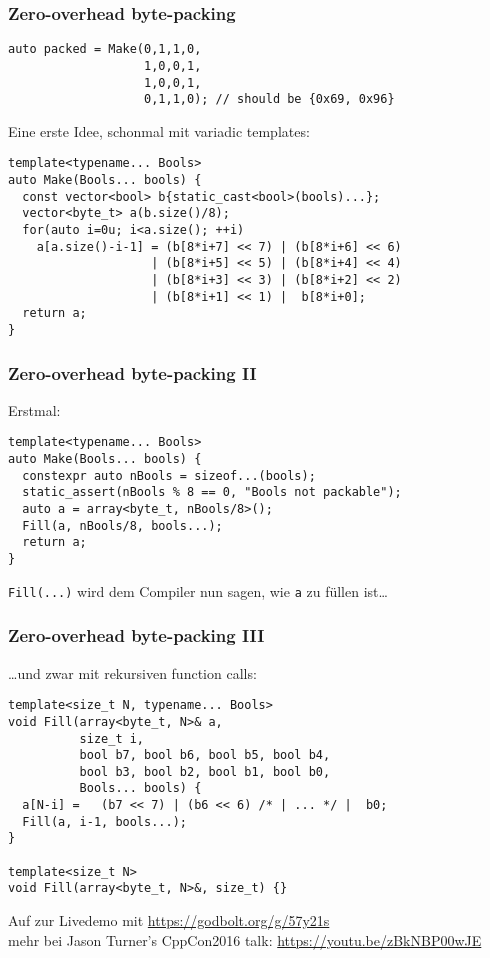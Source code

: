 \documentclass[t,ngerman,usepdftitle=false]{beamer}
\begin{document}
\begin{frame}[fragile]
  \frametitle{Zero-overhead byte-packing}
  \begin{lstlisting}
auto packed = Make(0,1,1,0,
                   1,0,0,1,	
                   1,0,0,1,
                   0,1,1,0); // should be {0x69, 0x96}
  \end{lstlisting}

\pause
Eine erste Idee, schonmal mit variadic templates:
\begin{lstlisting}
template<typename... Bools>
auto Make(Bools... bools) {
  const vector<bool> b{static_cast<bool>(bools)...};
  vector<byte_t> a(b.size()/8);
  for(auto i=0u; i<a.size(); ++i)
    a[a.size()-i-1] = (b[8*i+7] << 7) | (b[8*i+6] << 6) 
                    | (b[8*i+5] << 5) | (b[8*i+4] << 4) 
                    | (b[8*i+3] << 3) | (b[8*i+2] << 2) 
                    | (b[8*i+1] << 1) |  b[8*i+0];
  return a;
}
\end{lstlisting}
  
\end{frame}

\begin{frame}[fragile]
  \frametitle{Zero-overhead byte-packing II}
  
Erstmal: 
\begin{lstlisting}
template<typename... Bools>
auto Make(Bools... bools) {
  constexpr auto nBools = sizeof...(bools);
  static_assert(nBools % 8 == 0, "Bools not packable");
  auto a = array<byte_t, nBools/8>();
  Fill(a, nBools/8, bools...);
  return a;
}
\end{lstlisting}

\lstinline|Fill(...)| wird dem Compiler nun sagen, wie \lstinline|a| zu füllen ist\ldots

\end{frame}

\begin{frame}[fragile]
  \frametitle{Zero-overhead byte-packing III}

\ldots{}und zwar mit rekursiven function calls:
\begin{lstlisting}
template<size_t N, typename... Bools>
void Fill(array<byte_t, N>& a,
          size_t i,
          bool b7, bool b6, bool b5, bool b4,
          bool b3, bool b2, bool b1, bool b0,
          Bools... bools) {
  a[N-i] =   (b7 << 7) | (b6 << 6) /* | ... */ |  b0;
  Fill(a, i-1, bools...);
}

template<size_t N>
void Fill(array<byte_t, N>&, size_t) {}
\end{lstlisting}

\pause
\begin{block}{}
  \centering Auf zur Livedemo mit \url{https://godbolt.org/g/57y21s}\\
  {\small mehr bei Jason Turner's CppCon2016 talk: \url{https://youtu.be/zBkNBP00wJE}}
\end{block}
    
\end{frame}
\end{document}
